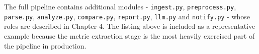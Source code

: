 The full pipeline contains additional modules - \texttt{ingest.py}, \texttt{preprocess.py}, \texttt{parse.py}, \texttt{analyze.py}, \texttt{compare.py}, \texttt{report.py}, \texttt{llm.py} and \texttt{notify.py} - whose roles are described in Chapter 4. The listing above is included as a representative example because the metric extraction stage is the most heavily exercised part of the pipeline in production.
